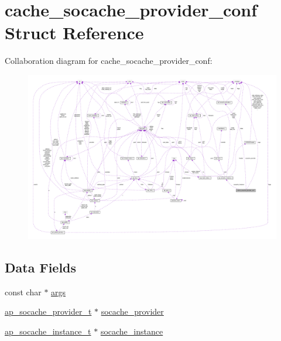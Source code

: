 \hypertarget{structcache__socache__provider__conf}{}\section{cache\+\_\+socache\+\_\+provider\+\_\+conf Struct Reference}
\label{structcache__socache__provider__conf}


Collaboration diagram for cache\+\_\+socache\+\_\+provider\+\_\+conf\+:
\nopagebreak
\begin{figure}[H]
\begin{center}
\leavevmode
\includegraphics[width=350pt]{structcache__socache__provider__conf__coll__graph}
\end{center}
\end{figure}
\subsection*{Data Fields}
\begin{DoxyCompactItemize}
\item 
const char $\ast$ \hyperlink{structcache__socache__provider__conf_a41f0a22b95ee1c07fcde29e2ef2ce1db}{args}
\item 
\hyperlink{structap__socache__provider__t}{ap\+\_\+socache\+\_\+provider\+\_\+t} $\ast$ \hyperlink{structcache__socache__provider__conf_adfc2652c45e2f5149307e7f84a6acef3}{socache\+\_\+provider}
\item 
\hyperlink{structap__socache__instance__t}{ap\+\_\+socache\+\_\+instance\+\_\+t} $\ast$ \hyperlink{structcache__socache__provider__conf_af25944837e818cb3d6bac537a9bf9023}{socache\+\_\+instance}
\end{DoxyCompactItemize}


